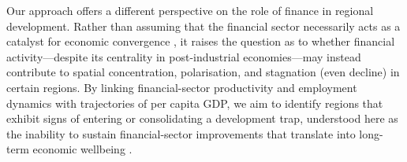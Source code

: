 \documentclass[a4paper,11pt,oneside]{article}
\begin{document}


Our approach offers a different perspective on the role of finance in regional development. Rather than assuming that the financial sector necessarily acts as a catalyst for economic convergence \citep{berthelemy1996economic,aghion2005effect}, it raises the question as to whether financial activity---despite its centrality in post-industrial economies---may instead contribute to spatial concentration, polarisation, and stagnation (even decline) in certain regions. By linking financial-sector productivity and employment dynamics with trajectories of per capita GDP, we aim to identify regions that exhibit signs of entering or consolidating a development trap, understood here as the inability to sustain financial-sector improvements that translate into long-term economic wellbeing \citep{wojcik2025finance}.


\end{document}
